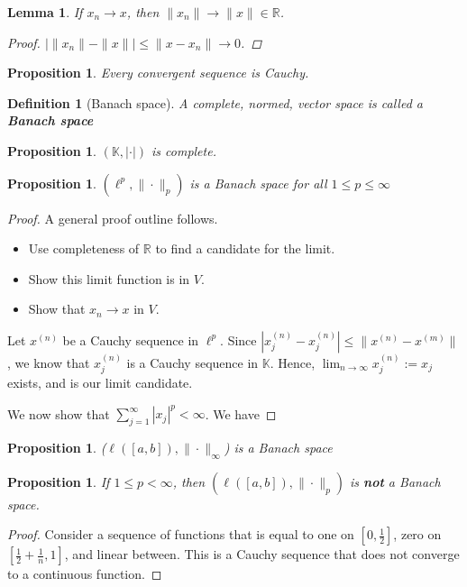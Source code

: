 \documentclass[12pt, oneside, a4paper]{article}
\newtheorem{lem}[thm]{Lemma}
\newtheorem{prop}[thm]{Proposition}
\theoremstyle{dfn}
\newtheorem{dfn}[thm]{Definition}
\newcommand{\R}{\mathbb{R}}
\newcommand{\K}{\mathbb{K}}
\begin{document}
\begin{lem}
    If $x_n \rightarrow x$, then $\| x_n \| \rightarrow \| x \| \in \R$.
    \begin{proof}
        $\left| \| x_n \| - \| x \| \right| \leq \| x - x_n \| \rightarrow 0$.
    \end{proof}
\end{lem}

\begin{prop}
    Every convergent sequence is Cauchy.
\end{prop}

\begin{dfn}[Banach space]
A complete, normed, vector space is called a \textbf{Banach space}
\end{dfn}

\begin{prop}
    $( \K, |\cdot |)$ is complete.
\end{prop}

\begin{prop}
    $(\ell^p, \| \cdot \|_p)$ is a Banach space for all $1 \leq p \leq \infty$
\end{prop}

\begin{proof}
    A general proof outline follows.
    \begin{itemize}
        \item Use completeness of $\R$ to find a candidate for the limit.
        \item Show this limit function is in $V$.
        \item Show that $x_n \rightarrow x$ in $V$.
    \end{itemize}
    Let $x^{(n)}$ be a Cauchy sequence in $\ell^p$.  Since $|x_j^{(n)} - x_{j}^{(n)}| \leq \|x^{(n)} - x^{(m)}\|$, we know that $x^{(n)}_j$ is a Cauchy sequence in $\K$.  Hence, $\lim_{n \rightarrow \infty} x^{(n)}_j := x_j$ exists, and is our limit candidate.
    
    We now show that $\sum_{j =1}^\infty |x_j|^p < \infty$.  We have 
\end{proof}

\begin{prop}
    ($\ell([a,b]), \|\cdot \|_\infty$) is a Banach space
\end{prop}

\begin{prop}
    If $1 \leq p < \infty$, then $(\ell([a,b]), \| \cdot \|_p)$ is \textbf{not} a Banach space.
\end{prop}
\begin{proof}
    Consider a sequence of functions that is equal to one on $[0, \frac{1}{2}]$, zero on $[\frac{1}{2}+ \frac{1}{n}, 1]$, and linear between.  This is a Cauchy sequence that does not converge to a continuous function. 
\end{proof}
\end{document}
